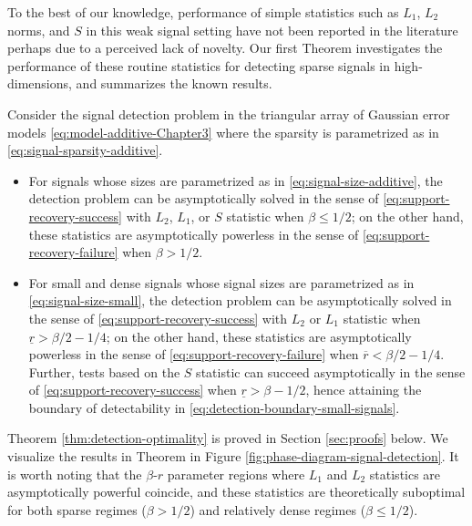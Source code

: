 To the best of our knowledge, performance of simple statistics such as $L_1$, $L_2$ norms, and $S$ in this weak signal setting have not been reported in the literature perhaps due to a perceived lack of novelty.
Our first Theorem investigates the performance of these routine statistics for detecting sparse signals in high-dimensions, and summarizes the known results.

\begin{theorem} \label{thm:detection-optimality}
Consider the signal detection problem in the triangular array of Gaussian error models \eqref{eq:model-additive-Chapter3} where the sparsity is parametrized as in \eqref{eq:signal-sparsity-additive}.
\begin{itemize}
    \item For signals whose sizes are parametrized as in \eqref{eq:signal-size-additive}, the detection problem can be asymptotically solved in the sense of \eqref{eq:support-recovery-success} with $L_2$, $L_1$, or $S$ statistic when $\beta\le 1/2$; on the other hand, these statistics are asymptotically powerless in the sense of \eqref{eq:support-recovery-failure} when $\beta>1/2$.
    \item For small and dense signals whose signal sizes are parametrized as in \eqref{eq:signal-size-small}, the detection problem can be asymptotically solved in the sense of \eqref{eq:support-recovery-success} with $L_2$ or $L_1$ statistic when $\underline{r}>\beta/2-{1}/{4}$; on the other hand, these statistics are asymptotically powerless in the sense of \eqref{eq:support-recovery-failure} when $\overline{r}<\beta/2-{1}/{4}$.
    Further, tests based on the $S$ statistic can succeed asymptotically in the sense of \eqref{eq:support-recovery-success} when $\underline{r}>\beta-1/2$, hence attaining the boundary of detectability in \eqref{eq:detection-boundary-small-signals}.
\end{itemize}
\end{theorem}

Theorem \ref{thm:detection-optimality} is proved in Section \ref{sec:proofs} below.
We visualize the results in Theorem in Figure \ref{fig:phase-diagram-signal-detection}.
It is worth noting that the $\beta$-$r$ parameter regions where $L_1$ and $L_2$ statistics are asymptotically powerful coincide, and these statistics are theoretically suboptimal for both sparse regimes ($\beta>1/2$) and relatively dense regimes ($\beta\le 1/2$).

